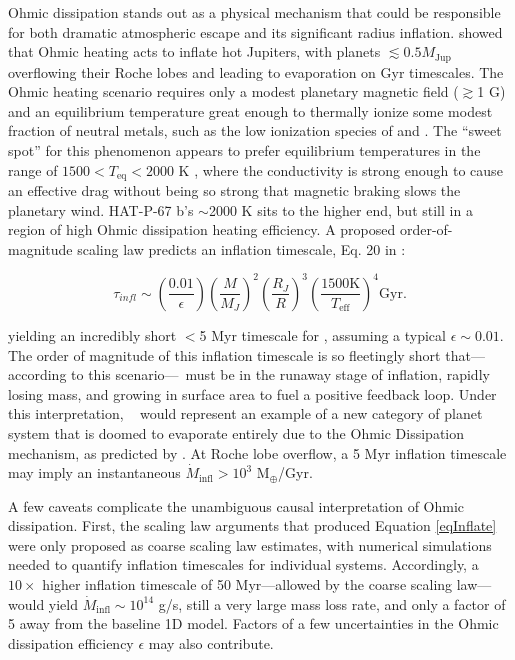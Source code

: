 \documentclass[twocolumn]{aastex631}
\newcommand{\hatpb}{\object{HAT-P-67 b}}
\begin{document}
Ohmic dissipation stands out as a physical mechanism that could be responsible for both dramatic atmospheric escape and its significant radius inflation.  \citet{2011ApJ...738....1B} showed that Ohmic heating acts to inflate hot Jupiters, with planets $\lesssim 0.5 M_\mathrm{Jup}$ overflowing their Roche lobes and leading to evaporation on Gyr timescales.  The Ohmic heating scenario requires only a modest planetary magnetic field ($\gtrsim$1 G) and an equilibrium temperature great enough to thermally ionize some modest fraction of neutral metals, such as the low ionization species of  and .  The ``sweet spot'' for this phenomenon appears to prefer equilibrium temperatures in the range of $1500<T_\mathrm{eq}<2000$ K \citep{2011ApJ...738....1B,2012ApJ...745..138M,2016ApJ...819..116G,2018AJ....155..214T,2022A&A...658L...7K}, where the conductivity is strong enough to cause an effective drag without being so strong that magnetic braking slows the planetary wind.  HAT-P-67 b's $\sim$2000 K sits to the higher end, but still in a region of high Ohmic dissipation heating efficiency.  A proposed order-of-magnitude scaling law predicts an inflation timescale, Eq. 20 in \citet{2011ApJ...738....1B}:

\begin{equation}
    \tau_{\textit{infl}}\sim \left(\frac{0.01}{\epsilon} \right) \left(\frac{M}{M_{J}}\right)^2 \left(\frac{R_{J}}{R}\right)^3 \left(\frac{1500 \textrm{K}}{T_\mathrm{eff}}\right)^4 \textrm{Gyr}. \label{eqInflate}
\end{equation}


\noindent yielding an incredibly short $<$5 Myr timescale for \hatpb, assuming a typical $\epsilon\sim0.01$.  The order of magnitude of this inflation timescale is so fleetingly short that---according to this scenario---\hatpb~must be in the runaway stage of inflation, rapidly losing mass, and growing in surface area to fuel a positive feedback loop.  Under this interpretation, \hatpb~ would represent an example of a new category of planet system that is doomed to evaporate entirely due to the Ohmic Dissipation mechanism, as predicted by \citet{2011ApJ...738....1B}.  At Roche lobe overflow, a 5 Myr inflation timescale may imply an instantaneous $\dot{M}_\mathrm{infl}>10^{3}$ M$_\oplus$/Gyr.

A few caveats complicate the unambiguous causal interpretation of Ohmic dissipation.  First, the scaling law arguments that produced Equation \ref{eqInflate} were only proposed as coarse scaling law estimates, with numerical simulations needed to quantify inflation timescales for individual systems.  Accordingly, a $10\times$ higher inflation timescale of 50 Myr---allowed by the coarse scaling law---would yield $\dot{M}_\mathrm{infl}\sim10^{14}$ g/s, still a very large mass loss rate, and only a factor of 5 away from the baseline 1D model.  Factors of a few uncertainties in the Ohmic dissipation efficiency $\epsilon$ may also contribute.
\end{document}

